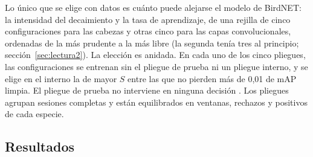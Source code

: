 Lo único que se elige con datos es cuánto puede alejarse el modelo de BirdNET: la intensidad del decaimiento y la tasa de aprendizaje, de una
rejilla de cinco configuraciones para las cabezas y otras cinco para las capas convolucionales, ordenadas de la más prudente a la más libre
(la segunda tenía tres al principio; sección~\ref{sec:lectura2}). La elección es anidada. En cada uno de los cinco
pliegues, las configuraciones se entrenan sin el pliegue de prueba ni un pliegue interno, y se elige en el interno la de mayor $S$ entre las que
no pierden más de 0,01 de mAP limpia. El pliegue de prueba no interviene en ninguna decisión \citep{kaufman2012leakage}. Los pliegues agrupan
sesiones completas y están equilibrados en ventanas, rechazos y positivos de cada especie.

\subsection{Resultados}\label{sec:resultados2}

